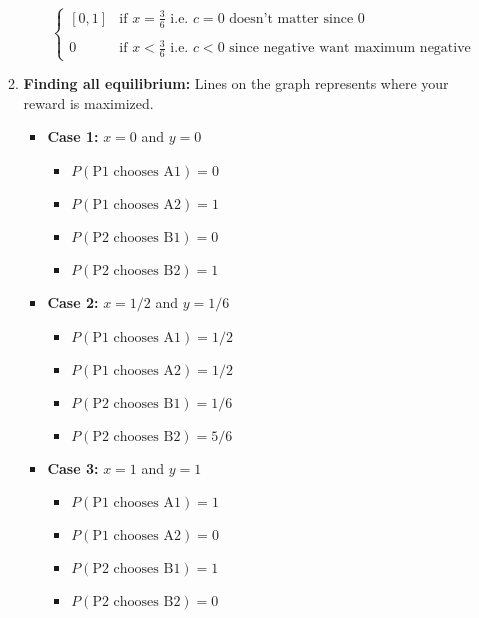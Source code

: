 \begin{example}
\begin{enumerate}
\begin{enumerate}
\begin{itemize}
\begin{equation*}
\begin{cases}
                        [0,1] & \text{if } x=\frac{3}{6} \text{ i.e. }c = 0 \text{ doesn't matter since 0} \\
                        & \\
                        0 & \text{if } x < \frac{3}{6} \text{ i.e. } c < 0 \text{ since negative want maximum negative}
                    \end{cases}
                \end{equation*}
            \end{itemize}
            \item \textbf{Finding all equilibrium:} Lines on the graph represents where your reward is maximized. 
            \begin{itemize}
                \item \textbf{Case 1:} $x=0$ and $y=0$
                \begin{itemize}
                    \item $P(\text{P1 chooses A1}) = 0$ 
                    \item $P(\text{P1 chooses A2}) = 1$
                    \item $P(\text{P2 chooses B1}) = 0$
                    \item $P(\text{P2 chooses B2}) = 1$
                \end{itemize}
                \item \textbf{Case 2:} $x=1/2$ and $y=1/6$
                \begin{itemize}
                    \item $P(\text{P1 chooses A1}) = 1/2$
                    \item $P(\text{P1 chooses A2}) = 1/2$
                    \item $P(\text{P2 chooses B1}) = 1/6$
                    \item $P(\text{P2 chooses B2}) = 5/6$
                \end{itemize}
                \item \textbf{Case 3:} $x=1$ and $y=1$
                \begin{itemize}
                    \item $P(\text{P1 chooses A1}) = 1$
                    \item $P(\text{P1 chooses A2}) = 0$
                    \item $P(\text{P2 chooses B1}) = 1$
                    \item $P(\text{P2 chooses B2}) = 0$

\end{itemize}
\end{itemize}
\end{enumerate}
\end{enumerate}
\end{example}
